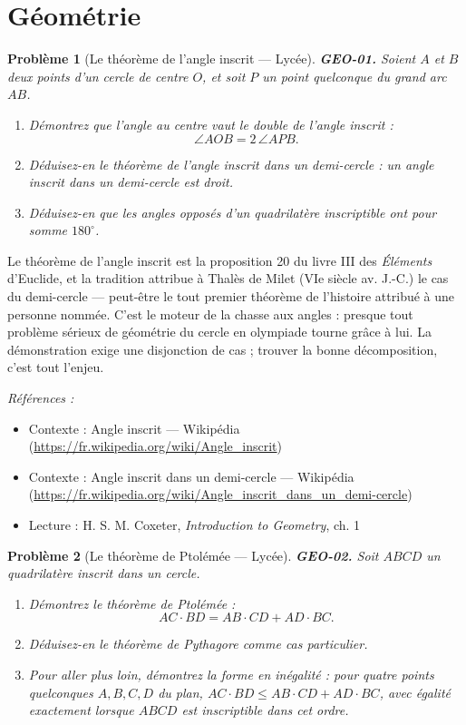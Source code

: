 \documentclass[11pt]{article}
\newtheorem{problem}{Problème}
\newenvironment{refs}{\par\small\noindent\emph{Références :}\begin{itemize}\setlength\itemsep{0pt}}{\end{itemize}\normalsize}
\begin{document}
\bigskip


\section*{Géométrie}

\begin{problem}[{Le théorème de l'angle inscrit --- Lycée}]
\textbf{GEO-01.} Soient $ A $ et $ B $ deux points d'un cercle de centre $ O $,
et soit $ P $ un point quelconque du grand arc $ AB $.
\begin{enumerate}
\item[(a)] Démontrez que l'angle au centre vaut le double de l'angle inscrit :
\[ \angle AOB = 2\,\angle APB. \]
\item[(b)] Déduisez-en le théorème de l'angle inscrit dans un demi-cercle : un angle inscrit dans un demi-cercle est droit.
\item[(c)] Déduisez-en que les angles opposés d'un quadrilatère inscriptible ont pour somme $ 180^\circ $.
\end{enumerate}

\end{problem}

\noindent Le théorème de l'angle inscrit est la proposition 20 du livre III des
\textit{Éléments} d'Euclide, et la tradition attribue à Thalès de Milet (VIe siècle
av. J.-C.) le cas du demi-cercle --- peut-être le tout premier théorème de l'histoire attribué
à une personne nommée. C'est le moteur de la \og{} chasse aux angles \fg{} : presque tout problème
sérieux de géométrie du cercle en olympiade tourne grâce à lui. La démonstration exige une
disjonction de cas ; trouver la bonne décomposition, c'est tout l'enjeu.

\begin{refs}
\item Contexte : Angle inscrit --- Wikipédia (\url{https://fr.wikipedia.org/wiki/Angle_inscrit})
\item Contexte : Angle inscrit dans un demi-cercle --- Wikipédia (\url{https://fr.wikipedia.org/wiki/Angle_inscrit_dans_un_demi-cercle})
\item Lecture : H. S. M. Coxeter, \textit{Introduction to Geometry}, ch. 1
\end{refs}

\bigskip

\begin{problem}[{Le théorème de Ptolémée --- Lycée}]
\textbf{GEO-02.} Soit $ ABCD $ un quadrilatère inscrit dans un cercle.
\begin{enumerate}
\item[(a)] Démontrez le théorème de Ptolémée :
\[ AC \cdot BD = AB \cdot CD + AD \cdot BC. \]
\item[(b)] Déduisez-en le théorème de Pythagore comme cas particulier.
\item[(c)] Pour aller plus loin, démontrez la forme en inégalité : pour \textit{quatre points quelconques}
$ A, B, C, D $ du plan, $ AC \cdot BD \le AB \cdot CD + AD \cdot BC $, avec
égalité exactement lorsque $ ABCD $ est inscriptible dans cet ordre.
\end{enumerate}

\end{problem}
\end{document}

